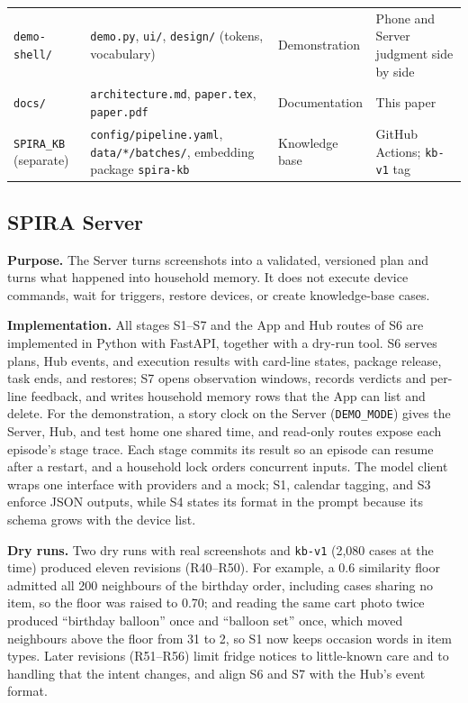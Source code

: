 \documentclass[conference]{IEEEtran}
\begin{document}
\begin{table}[!t]
\begin{tabularx}{\textwidth}{@{}L{0.20\textwidth}L{0.34\textwidth}L{0.13\textwidth}X@{}}
\texttt{demo-shell/} & \texttt{demo.py}, \texttt{ui/}, \texttt{design/} (tokens, vocabulary) & Demonstration & Phone and Server judgment side by side \\
\texttt{docs/} & \texttt{architecture.md}, \texttt{paper.tex}, \texttt{paper.pdf} & Documentation & This paper \\
\texttt{SPIRA\_KB} (separate) & \texttt{config/pipeline.yaml}, \texttt{data/*/batches/}, embedding package \texttt{spira-kb} & Knowledge base & GitHub Actions; \texttt{kb-v1} tag \\
\bottomrule
\end{tabularx}
\label{tab:dirs}
\end{table}

\subsection{SPIRA Server}
\textbf{Purpose.} The Server turns screenshots into a validated, versioned plan and turns what happened into household memory. It does not execute device commands, wait for triggers, restore devices, or create knowledge-base cases.

\textbf{Implementation.} All stages S1--S7 and the App and Hub routes of S6 are implemented in Python with FastAPI, together with a dry-run tool. S6 serves plans, Hub events, and execution results with card-line states, package release, task ends, and restores; S7 opens observation windows, records verdicts and per-line feedback, and writes household memory rows that the App can list and delete. For the demonstration, a story clock on the Server (\texttt{DEMO\_MODE}) gives the Server, Hub, and test home one shared time, and read-only routes expose each episode's stage trace. Each stage commits its result so an episode can resume after a restart, and a household lock orders concurrent inputs. The model client wraps one interface with providers and a mock; S1, calendar tagging, and S3 enforce JSON outputs, while S4 states its format in the prompt because its schema grows with the device list.

\textbf{Dry runs.} Two dry runs with real screenshots and \texttt{kb-v1} (2,080 cases at the time) produced eleven revisions (R40--R50). For example, a 0.6 similarity floor admitted all 200 neighbours of the birthday order, including cases sharing no item, so the floor was raised to 0.70; and reading the same cart photo twice produced ``birthday balloon'' once and ``balloon set'' once, which moved neighbours above the floor from 31 to 2, so S1 now keeps occasion words in item types. Later revisions (R51--R56) limit fridge notices to little-known care and to handling that the intent changes, and align S6 and S7 with the Hub's event format.
\end{document}
